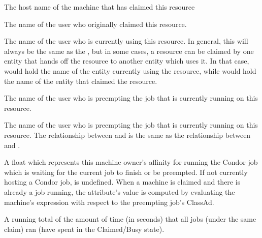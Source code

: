 \begin{description}

\item[\AdAttr{ClientMachine}:] The host name of the machine that has
claimed this resource

\item[\AdAttr{RemoteOwner}:] The name of the user who originally
claimed this resource.

\item[\AdAttr{RemoteUser}:] The name of the user who is currently
using this resource.
In general, this will always be the same as the ,
but in some cases, a resource can be claimed by one entity that hands
off the resource to another entity which uses it.
In that case,  would hold the name of the entity
currently using the resource, while  would hold
the name of the entity that claimed the resource.

\item[\AdAttr{PreemptingOwner}:] The name of the user who is preempting
the job that is currently running on this resource.

\item[\AdAttr{PreemptingUser}:] The name of the user who is preempting
the job that is currently running on this resource.  The relationship
between  and  is the same
as the relationship between  and .

\item[\AdAttr{PreemptingRank}:] A float which represents this machine
owner's affinity for running the Condor job which is waiting for the
current job to finish or be preempted.  If not currently hosting a
Condor job,  is undefined.  When a machine is
claimed and there is already a job running, the attribute's value is
computed by evaluating the machine's  expression with
respect to the preempting job's ClassAd.

\item[\AdAttr{TotalClaimRunTime}:] A running total of the amount of
time (in seconds) that all jobs (under the same claim) ran
(have spent in the Claimed/Busy state).



\end{description}
